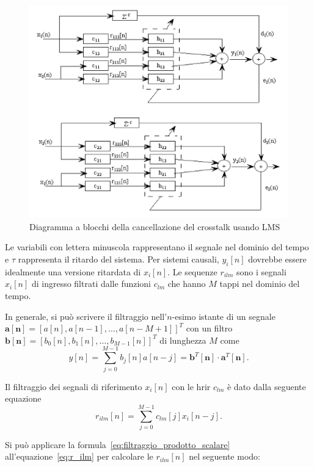 \documentclass[12pt,a4paper,titlepage]{article}
\begin{document}
\begin{figure}[h]
	\centering	
	\includegraphics[width=\textwidth]{Immagini/lms.png}
	\caption{Diagramma a blocchi della cancellazione del crosstalk usando LMS}
	\label{fig:lms}
\end{figure}

Le variabili con lettera minuscola rappresentano il segnale nel dominio del tempo e $\tau$ rappresenta il ritardo del sistema. Per sistemi causali, $y_i[n]$ dovrebbe essere idealmente una versione ritardata di $x_i[n]$. Le sequenze $r_{ilm}$ sono i segnali $x_i[n]$ di ingresso filtrati dalle funzioni $c_{lm}$ che hanno $M$ tappi nel dominio del tempo.

In generale, si può scrivere il filtraggio nell'$n$-esimo istante di un segnale $\mathbf{a[n]} = \left[a[n], a[n-1], \dots, a[n - M + 1]\right]^T$ con un filtro $\mathbf{b[n]} =  \left[b_{0}[n], b_{1}[n], \dots, b_{M-1}[n]\right]^T$ di lunghezza $M$ come
\begin{equation}\label{eq:filtraggio_prodotto_scalare}
y[n] = \sum_{j=0}^{M-1}b_{j}[n]a[n-j] = \mathbf{b}^T[\mathbf{n}] \cdot \mathbf{a}^T[\mathbf{n}].
\end{equation}

Il filtraggio dei segnali di riferimento $x_i[n]$ con le hrir $c_{lm}$ è dato dalla seguente equazione
\begin{equation}\label{eq:r_ilm}
r_{ilm}[n]=\sum_{j=0}^{M-1}c_{lm}[j]x_i[n-j].
\end{equation}

Si può applicare la formula~\eqref{eq:filtraggio_prodotto_scalare} all'equazione~\eqref{eq:r_ilm} per calcolare le $r_{ilm}[n]$ nel seguente modo:
\end{document}

